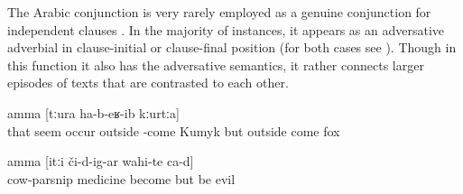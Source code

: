 The Arabic conjunction   is very rarely employed as a genuine conjunction for independent clauses . In the majority of instances, it appears as an adversative adverbial in clause-initial  or clause-final position  (for both cases see ). Though in this function it also has the adversative semantics, it rather connects larger episodes of texts that are contrasted to each other.
%
\begin{exe}
	\ex	\label{ex:‎‎‎He thought that the Kumyk man would come out (of the pit), but a fox came out}
		amma	[tːura	ha-b-eʁ-ib kːurtːa]\\
		that	seem	occur	outside -come	Kumyk		but	outside come	fox\\
	\glt	{}

	\ex	\label{ex:‎‎‎There is this medical cow-parsnip, but if these (plants) get on (the skin), it is bad}
	\gll	[birikːʷa=ra	darman-na	d-irχʷ-ar]	amma	[itːi	či-d-ig-ar	wahi-te	ca-d]\\
		cow-parsnip	medicine	become	but		be	evil \\
	\glt	{}
\end{exe}

